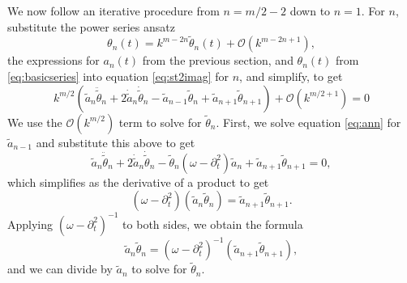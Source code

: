 \documentclass[11pt,reqno]{amsart}
\begin{document}
We now follow an iterative procedure from $n=m/2-2$ down to $n=1$. For $n$, substitute the power series ansatz
\[
\theta_{n}(t) = k^{m-2n} \tilde{\theta}_{n}(t) + \mathcal{O}(k^{m-2n+1}),
\]
the expressions for $a_n(t)$ from the previous section, and $\theta_n(t)$ from \cref{eq:basicseries} into equation \cref{eq:st2imag} for $n$, and simplify, to get
\[
k^{m/2} \left( \tilde{a}_n \ddot{\tilde{\theta}}_n + 2 \dot{\tilde{a}}_n \dot{\tilde{\theta}}_n
- \tilde{a}_{n-1} \tilde{\theta}_n + \tilde{a}_{n+1}\tilde{\theta}_{n+1} \right) + \mathcal{O}\left(k^{m/2+1}\right) = 0
\]
We use the $\mathcal{O}(k^{m/2})$ term to solve for $\tilde{\theta}_{n}$. First, we solve equation \cref{eq:ann} for $\tilde{a}_{n-1}$ and substitute this above to get
\[
\tilde{a}_n \ddot{\tilde{\theta}}_n + 2 \dot{\tilde{a}}_n \dot{\tilde{\theta}}_n
- \tilde{\theta}_n (\omega - \partial_t^2) \tilde{a}_n + \tilde{a}_{n+1} \tilde{\theta}_{n+1} = 0,
\]
which simplifies as the derivative of a product to get
\[
(\omega - \partial_t^2)\left( \tilde{a}_n \tilde{\theta}_n \right) = \tilde{a}_{n+1} \tilde{\theta}_{n+1}.
\]
Applying $(\omega - \partial_t^2)^{-1}$ to both sides, we obtain the formula
\begin{equation}\label{an2th}
\tilde{a}_n \tilde{\theta}_n = (\omega - \partial_t^2)^{-1} \left( \tilde{a}_{n+1} \tilde{\theta}_{n+1} \right),
\end{equation}
and we can divide by $\tilde{a}_n$ to solve for $\tilde{\theta}_n$. 
\end{document}
